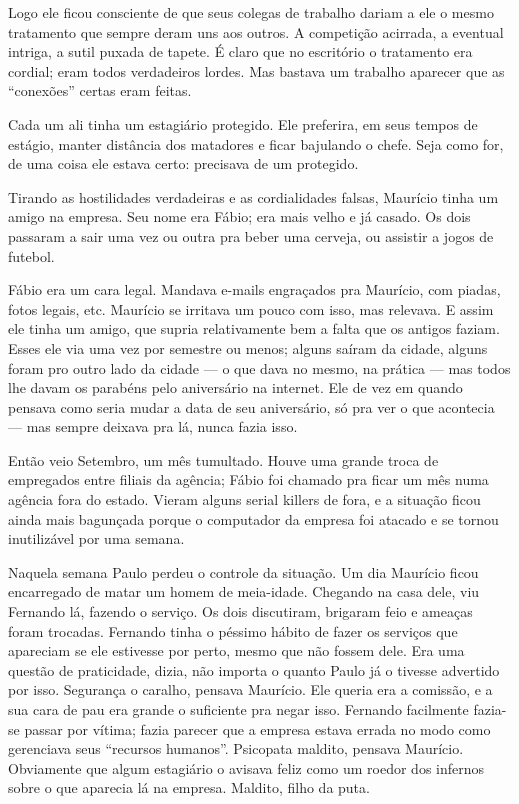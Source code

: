 Logo ele ficou consciente de que seus colegas de trabalho dariam a ele o mesmo tratamento que sempre deram uns aos outros. A competição acirrada, a eventual intriga, a sutil puxada de tapete. É claro que no escritório o tratamento era cordial; eram todos verdadeiros lordes. Mas bastava um trabalho aparecer que as “conexões” certas eram feitas.

Cada um ali tinha um estagiário protegido. Ele preferira, em seus tempos de estágio, manter distância dos matadores e ficar bajulando o chefe. Seja como for, de uma coisa ele estava certo: precisava de um protegido.

Tirando as hostilidades verdadeiras e as cordialidades falsas, Maurício tinha um amigo na empresa. Seu nome era Fábio; era mais velho e já casado. Os dois passaram a sair uma vez ou outra pra beber uma cerveja, ou assistir a jogos de futebol.

Fábio era um cara legal. Mandava e-mails engraçados pra Maurício, com piadas, fotos legais, etc. Maurício se irritava um pouco com isso, mas relevava. E assim ele tinha um amigo, que supria relativamente bem a falta que os antigos faziam. Esses ele via uma vez por semestre ou menos; alguns saíram da cidade, alguns foram pro outro lado da cidade --- o que dava no mesmo, na prática --- mas todos lhe davam os pa\-ra\-béns pelo aniversário na internet. Ele de vez em quando pensava como seria mudar a data de seu aniversário, só pra ver o que acontecia --- mas sempre deixava pra lá, nunca fazia isso.

\begin{sloppypar}
Então veio Setembro, um mês tumultado. Houve uma grande troca de empregados entre filiais da agência; Fábio foi chamado pra ficar um mês numa agência fora do estado. Vieram alguns \foreignlanguage{english}{serial killers} de fora, e a situação ficou ainda mais bagunçada porque o computador da empresa foi atacado e se tornou inutilizável por uma semana.
\end{sloppypar}

Naquela semana Paulo perdeu o controle da situação. Um dia Maurício ficou encarregado de matar um homem de meia-idade. Chegando na casa dele, viu Fernando lá, fazendo o serviço. Os dois discutiram, brigaram feio e ameaças foram trocadas. Fernando tinha o péssimo hábito de fazer os serviços que apareciam se ele estivesse por perto, mesmo que não fossem dele. Era uma questão de praticidade, dizia, não importa o quanto Paulo já o tivesse advertido por isso. Segurança o caralho, pensava Maurício. Ele queria era a comissão, e a sua cara de pau era grande o suficiente pra negar isso. Fernando facilmente fazia-se passar por vítima; fazia parecer que a empresa estava errada no modo como gerenciava seus ``recursos humanos''. Psicopata maldito, pensava Maurício. Obviamente que algum estagiário o avisava feliz como um roedor dos infernos sobre o que aparecia lá na empresa. Maldito, filho da puta.

